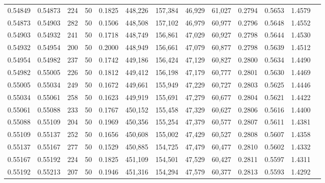 \begin{tabular}{rrrrrrrrrrrrr}
0.54849 & 0.54873 &   224 &  50 &                                     0.1825 & 448,226 & 157,384 &  46,929 &  61,027 & 0.2794 & 0.5653 & 1.4579 \\
0.54873 & 0.54903 &   282 &  50 &                                     0.1506 & 448,508 & 157,102 &  46,979 &  60,977 & 0.2796 & 0.5648 & 1.4552 \\
0.54903 & 0.54932 &   241 &  50 &                                     0.1718 & 448,749 & 156,861 &  47,029 &  60,927 & 0.2798 & 0.5644 & 1.4530 \\
0.54932 & 0.54954 &   200 &  50 &                                     0.2000 & 448,949 & 156,661 &  47,079 &  60,877 & 0.2798 & 0.5639 & 1.4512 \\
0.54954 & 0.54982 &   237 &  50 &                                     0.1742 & 449,186 & 156,424 &  47,129 &  60,827 & 0.2800 & 0.5634 & 1.4490 \\
0.54982 & 0.55005 &   226 &  50 &                                     0.1812 & 449,412 & 156,198 &  47,179 &  60,777 & 0.2801 & 0.5630 & 1.4469 \\
0.55005 & 0.55034 &   249 &  50 &                                     0.1672 & 449,661 & 155,949 &  47,229 &  60,727 & 0.2803 & 0.5625 & 1.4446 \\
0.55034 & 0.55061 &   258 &  50 &                                     0.1623 & 449,919 & 155,691 &  47,279 &  60,677 & 0.2804 & 0.5621 & 1.4422 \\
0.55061 & 0.55088 &   233 &  50 &                                     0.1767 & 450,152 & 155,458 &  47,329 &  60,627 & 0.2806 & 0.5616 & 1.4400 \\
0.55088 & 0.55109 &   204 &  50 &                                     0.1969 & 450,356 & 155,254 &  47,379 &  60,577 & 0.2807 & 0.5611 & 1.4381 \\
0.55109 & 0.55137 &   252 &  50 &                                     0.1656 & 450,608 & 155,002 &  47,429 &  60,527 & 0.2808 & 0.5607 & 1.4358 \\
0.55137 & 0.55167 &   277 &  50 &                                     0.1529 & 450,885 & 154,725 &  47,479 &  60,477 & 0.2810 & 0.5602 & 1.4332 \\
0.55167 & 0.55192 &   224 &  50 &                                     0.1825 & 451,109 & 154,501 &  47,529 &  60,427 & 0.2811 & 0.5597 & 1.4311 \\
0.55192 & 0.55213 &   207 &  50 &                                     0.1946 & 451,316 & 154,294 &  47,579 &  60,377 & 0.2813 & 0.5593 & 1.4292 \\

\end{tabular}
